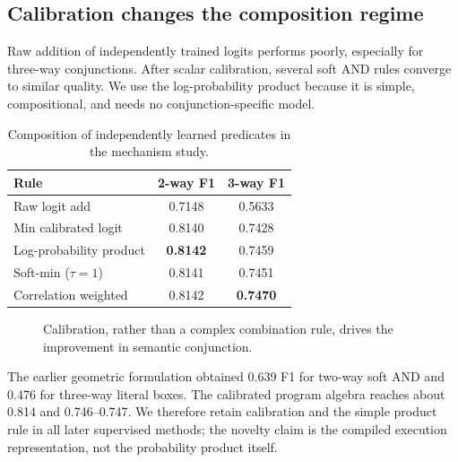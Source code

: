 
\subsection{Calibration changes the composition regime}
Raw addition of independently trained logits performs poorly, especially for three-way conjunctions. After scalar calibration, several soft AND rules converge to similar quality. We use the log-probability product because it is simple, compositional, and needs no conjunction-specific model.

\begin{table}[t]
\centering
\caption{Composition of independently learned predicates in the mechanism study.}
\label{tab:composition}
\small
\begin{tabular}{lcc}
\toprule
Rule & 2-way F1 & 3-way F1\\
\midrule
Raw logit add & 0.7148 & 0.5633\\
Min calibrated logit & 0.8140 & 0.7428\\
Log-probability product & \textbf{0.8142} & 0.7459\\
Soft-min ($\tau=1$) & 0.8141 & 0.7451\\
Correlation weighted & 0.8142 & \textbf{0.7470}\\
\bottomrule
\end{tabular}
\end{table}

\begin{figure}[t]
\centering
{}
\caption{Calibration, rather than a complex combination rule, drives the improvement in semantic conjunction.}
\label{fig:composition}
\end{figure}

The earlier geometric formulation obtained 0.639 F1 for two-way soft AND and 0.476 for three-way literal boxes. The calibrated program algebra reaches about 0.814 and 0.746--0.747. We therefore retain calibration and the simple product rule in all later supervised methods; the novelty claim is the compiled execution representation, not the probability product itself.

